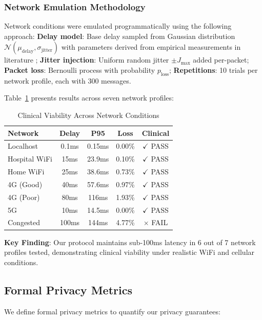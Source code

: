 \documentclass[conference]{IEEEtran}
\begin{document}
\subsubsection{Network Emulation Methodology}

Network conditions were emulated programmatically using the following approach: \textbf{Delay model}: Base delay sampled from Gaussian distribution $\mathcal{N}(\mu_{\text{delay}}, \sigma_{\text{jitter}})$ with parameters derived from empirical measurements in literature \cite{lan_smart_healthcare}; \textbf{Jitter injection}: Uniform random jitter $\pm J_{\text{max}}$ added per-packet; \textbf{Packet loss}: Bernoulli process with probability $p_{\text{loss}}$; \textbf{Repetitions}: 10 trials per network profile, each with 300 messages.

Table~\ref{tab:network} presents results across seven network profiles:

\begin{table}[htbp]
\caption{Clinical Viability Across Network Conditions}
\label{tab:network}
\centering
\begin{tabular}{lcccc}
\toprule
\textbf{Network} & \textbf{Delay} & \textbf{P95} & \textbf{Loss} & \textbf{Clinical} \\
\midrule
Localhost & 0.1ms & 0.15ms & 0.00\% & $\checkmark$ PASS \\
Hospital WiFi & 15ms & 23.9ms & 0.10\% & $\checkmark$ PASS \\
Home WiFi & 25ms & 38.6ms & 0.73\% & $\checkmark$ PASS \\
4G (Good) & 40ms & 57.6ms & 0.97\% & $\checkmark$ PASS \\
4G (Poor) & 80ms & 116ms & 1.93\% & $\checkmark$ PASS \\
5G & 10ms & 14.5ms & 0.00\% & $\checkmark$ PASS \\
Congested & 100ms & 144ms & 4.77\% & $\times$ FAIL \\
\bottomrule
\end{tabular}
\end{table}

\textbf{Key Finding}: Our protocol maintains sub-100ms latency in 6 out of 7 network profiles tested, demonstrating clinical viability under realistic WiFi and cellular conditions.

\subsection{Formal Privacy Metrics}

We define formal privacy metrics to quantify our privacy guarantees:
\end{document}
